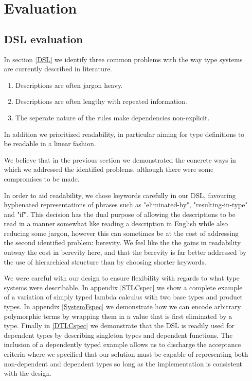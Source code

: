\chapter{Evaluation}

\section{DSL evaluation}
\label{chapter-DSL-eval}

In section \ref{DSL} we identify three common problems with the way type
systems are currently described in literature.

\begin{enumerate}
\item Descriptions are often jargon heavy.
\item Descriptions are often lengthy with repeated information.
\item The seperate nature of the rules make dependencies non-explicit.
\end{enumerate}

In addition we prioritized readability, in particular aiming for type
definitions to be readable in a linear fashion.

We believe that in the previous section we demonstrated the concrete
ways in which we addressed the identified problems, although there
were some compromises to be made.

In order to aid readability, we chose keywords carefully in our
DSL, favouring hyphenated representations of phrases such as
"eliminated-by", "resulting-in-type" and "if". This decision has the dual
purpose of allowing the descriptions to be read in a manner somewhat
like reading a description in English while also reducing some jargon,
however this can sometimes be at the cost of addressing the second
identified problem: berevity. We feel like the the gains in
readability outway the cost in berevity here, and that the berevity is
far better addressed by the use of hierarchical structure than by
choosing shorter keywords. 

We were careful with our design to ensure flexibility with regards to
what type systems were describable. In appendix \ref{STLCspec} we show
a complete example of a variation of simply typed lambda calculus with
two base types and product types. In appendix \ref{SystemFspec} we
demonstrate how we can encode arbitrary polymorphic terms by wrapping
them in a value that is first eliminated by a type. Finally in
\ref{DTLCspec} we demonstrate that the DSL is readily used for
dependent types by describing singleton types and dependent
functions. The inclusion of a dependently typed example allows us to
discharge the acceptance criteria where we specified that our solution
must be capable of representing both non-dependent and dependent types
so long as the implementation is consistent with the design.

